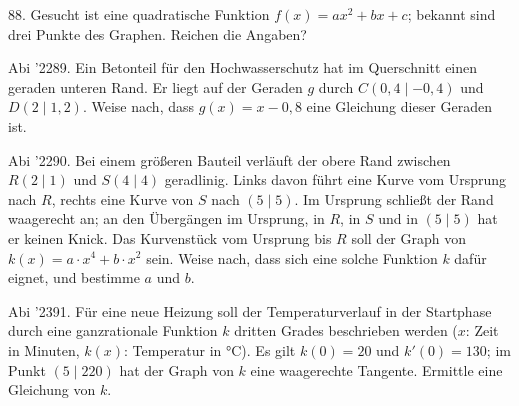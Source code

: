 \documentclass[11pt]{article}
\begin{document}
\begin{pfaufg}{}{88.}{}
Gesucht ist eine quadratische Funktion $f(x) = ax^2 + bx + c$; bekannt sind drei Punkte des Graphen. Reichen die Angaben? 
\end{pfaufg}
\pfgruppe{}
\begin{pfaufg}{Abi ’22}{89.}{}
Ein Betonteil für den Hochwasserschutz hat im Querschnitt einen geraden unteren Rand. Er liegt auf der Geraden $g$ durch $C(0{,}4 \mid -0{,}4)$ und $D(2 \mid 1{,}2)$. Weise nach, dass $g(x) = x - 0{,}8$ eine Gleichung dieser Geraden ist.
\par\smallskip\noindent {}\par
{}
\end{pfaufg}
\pfgruppe{}
\begin{pfaufg}{Abi ’22}{90.}{}
Bei einem größeren Bauteil verläuft der obere Rand zwischen $R(2 \mid 1)$ und $S(4 \mid 4)$ geradlinig. Links davon führt eine Kurve vom Ursprung nach $R$, rechts eine Kurve von $S$ nach $(5 \mid 5)$. Im Ursprung schließt der Rand waagerecht an; an den Übergängen im Ursprung, in $R$, in $S$ und in $(5 \mid 5)$ hat er keinen Knick. Das Kurvenstück vom Ursprung bis $R$ soll der Graph von $k(x) = a\cdot x^4 + b\cdot x^2$ sein. Weise nach, dass sich eine solche Funktion $k$ dafür eignet, und bestimme $a$ und $b$.
\par\smallskip\noindent {}\par
{}
\end{pfaufg}
\pfgruppe{}
\begin{pfaufg}{Abi ’23}{91.}{}
Für eine neue Heizung soll der Temperaturverlauf in der Startphase durch eine ganzrationale Funktion $k$ dritten Grades beschrieben werden ($x$: Zeit in Minuten, $k(x)$: Temperatur in °C). Es gilt $k(0) = 20$ und $k'(0) = 130$; im Punkt $(5 \mid 220)$ hat der Graph von $k$ eine waagerechte Tangente. Ermittle eine Gleichung von $k$.
\end{pfaufg}
\end{document}
